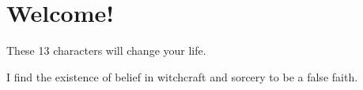 
\setcounter{footnote}{0}
\setcounter{endnote}{0}

\chapter{Welcome!}
\par These 13 characters will change your life.
\par I find the existence of belief in witchcraft and sorcery to be a false faith.

\theendnotes